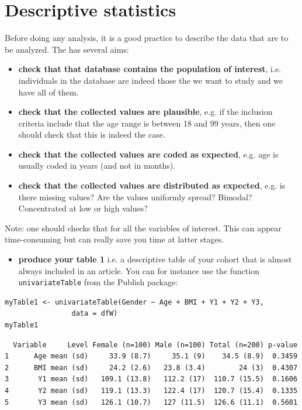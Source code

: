 \documentclass[12pt]{article}
\begin{document}
\section{Descriptive statistics}
\label{sec:descriptive}
Before doing any analysis, it is a good practice to describe the data
that are to be analyzed. The has several aims:
\begin{itemize}
\item \textbf{check that that database contains the population of interest},
i.e. individuals in the database are indeed those the we want to
study and we have all of them.
\item \textbf{check that the collected values are plausible}, e.g. if the inclusion
criteria include that the age range is between 18 and 99 years, then
one should check that this is indeed the case.
\item \textbf{check that the collected values are coded as expected}, e.g. age is
usually coded in years (and not in months).
\item \textbf{check that the collected values are distributed as expected},
e.g. is there missing values? Are the values uniformly spread?
Bimodal? Concentrated at low or high values?
\end{itemize}

Note: one should checks that for all the variables of interest. This
can appear time-consuming but can really save you time at latter
stages. 

\begin{itemize}
\item \textbf{produce your table 1} i.e. a descriptive table of your cohort that
is almost always included in an article. You can for instance use
the function \texttt{univariateTable} from the Publish package:
\end{itemize}
\lstset{language=r,label= ,caption= ,captionpos=b,numbers=none}
\begin{lstlisting}
myTable1 <- univariateTable(Gender ~ Age + BMI + Y1 + Y2 + Y3, 
			    data = dfW)
myTable1
\end{lstlisting}

\begin{verbatim}
  Variable     Level Female (n=100) Male (n=100) Total (n=200) p-value
1      Age mean (sd)     33.9 (8.7)     35.1 (9)    34.5 (8.9)  0.3459
2      BMI mean (sd)     24.2 (2.6)   23.8 (3.4)        24 (3)  0.4307
3       Y1 mean (sd)   109.1 (13.8)   112.2 (17)  110.7 (15.5)  0.1606
4       Y2 mean (sd)   119.1 (13.3)   122.4 (17)  120.7 (15.4)  0.1335
5       Y3 mean (sd)   126.1 (10.7)   127 (11.5)  126.6 (11.1)  0.5601
\end{verbatim}
\end{document}
